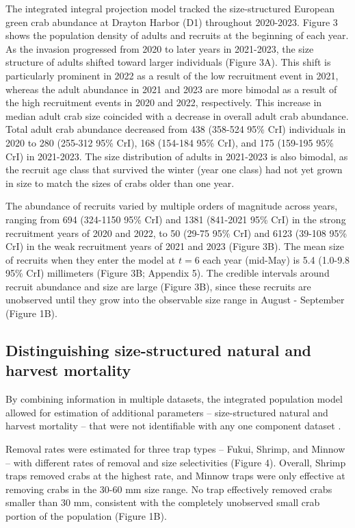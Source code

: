 \documentclass{article}
\begin{document}
The integrated integral projection model tracked the size-structured European green crab abundance at Drayton Harbor (D1) throughout 2020-2023. Figure 3 shows the population density of adults and recruits at the beginning of each year. As the invasion progressed from 2020 to later years in 2021-2023, the size structure of adults shifted toward larger individuals (Figure 3A). This shift is particularly prominent in 2022 as a result of the low recruitment event in 2021, whereas the adult abundance in 2021 and 2023 are more bimodal as a result of the high recruitment events in 2020 and 2022, respectively. This increase in median adult crab size coincided with a decrease in overall adult crab abundance. Total adult crab abundance decreased from 438 (358-524 95\% CrI) individuals in 2020 to 280 (255-312 95\% CrI), 168 (154-184 95\% CrI), and 175 (159-195 95\% CrI) in 2021-2023. The size distribution of adults in 2021-2023 is also bimodal, as the recruit age class that survived the winter (year one class) had not yet grown in size to match the sizes of crabs older than one year.

The abundance of recruits varied by multiple orders of magnitude across years, ranging from 694 (324-1150 95\% CrI) and 1381 (841-2021 95\% CrI) in the strong recruitment years of 2020 and 2022, to 50 (29-75 95\% CrI) and 6123 (39-108 95\% CrI) in the weak recruitment years of 2021 and 2023 (Figure 3B). The mean size of recruits when they enter the model at $t = 6$ each year (mid-May) is 5.4 (1.0-9.8 95\% CrI) millimeters (Figure 3B; Appendix 5). The credible intervals around recruit abundance and size are large (Figure 3B), since these recruits are unobserved until they grow into the observable size range in August - September (Figure 1B).

\subsection{Distinguishing size-structured natural and harvest mortality}

By combining information in multiple datasets, the integrated population model allowed for estimation of additional parameters -- size-structured natural and harvest mortality -- that were not identifiable with any one component dataset \parencite{riecke2019integrated}.

Removal rates were estimated for three trap types -- Fukui, Shrimp, and Minnow -- with different rates of removal and size selectivities (Figure 4). Overall, Shrimp traps removed crabs at the highest rate, and Minnow traps were only effective at removing crabs in the 30-60 mm size range. No trap effectively removed crabs smaller than 30 mm, consistent with the completely unobserved small crab portion of the population (Figure 1B).
\end{document}

